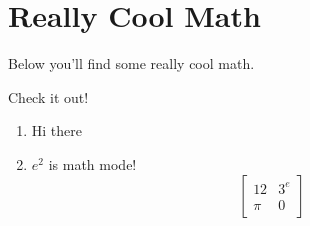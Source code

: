 \section*     {Really Cool Math}Below you'll find some really cool math.

Check it out!\begin{enumerate}
    \item[(a)] Hi there
\item$e^2$ is math mode! \[\begin{bmatrix}12&3^e\\\pi&0\end{bmatrix}\]
\end{enumerate}
